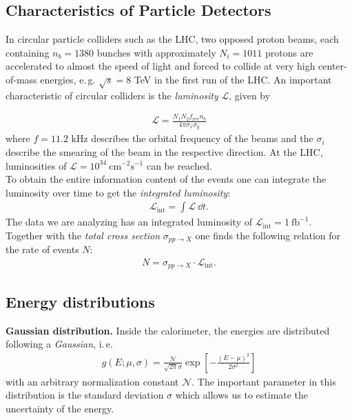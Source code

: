 \documentclass[twocolumn,
			   showpacs,%
               nofootinbib,
               aps,%
               prd,
               notitlepage,
               showkeys,
               10pt]{revtex4-1}
\begin{document}
\subsection{Characteristics of Particle Detectors}
In circular particle colliders such as the LHC, two opposed proton beams, each containing $n_b = 1380$ bunches with approximately $N_i = 1011$ protons are accelerated to almost the speed of light and forced to collide at very high center-of-mass energies, e.\,g. $\sqrt{s} = 8$ TeV in the first run of the LHC. An important characteristic of circular colliders is the \textit{luminosity} $\mathcal{L}$, given by

\begin{align}
\mathcal{L} = \frac{N_1N_2f_{\text{rev}}n_b}{4\pi\sigma_x\sigma_y}
\end{align}
where $f = 11.2$ kHz describes the orbital frequency of the beams and the $\sigma_i$ describe the smearing of the beam in the respective direction. At the LHC, luminosities of $\mathcal{L}=10^{34} \ \mathrm{cm}^{-2} \mathrm{s}^{-1}$ can be reached.\\
To obtain the entire information content of the events one can integrate the luminosity over time to get the \textit{integrated luminosity}:
\begin{align}
\mathcal{L}_{\text{int}} = \int \mathcal{L} \ \dd t.
\end{align}
The data we are analyzing has an integrated luminosity of $\mathcal{L}_{\mathrm{int}}=1 \ \mathrm{fb}^{-1}$.\\
Together with the \textit{total cross section} $\sigma_{pp\rightarrow X}$ one finds the following relation for the rate of events $N$: 
\begin{align}
N = \sigma_{pp\rightarrow X} \cdot \mathcal{L}_{\text{int}}.
\end{align}

\subsection{Energy distributions}
\textbf{Gaussian distribution.} Inside the calorimeter, the energies are distributed following a \textit{Gaussian}, i.\,e. 
\begin{align}
g(E ; \mu, \sigma)=\frac{\mathcal{N}}{\sqrt{2 \pi} \sigma} \exp \left[-\frac{(E-\mu)^{2}}{2 \sigma^{2}}\right]
\label{eqn:Gaussian}
\end{align}
with an arbitrary normalization constant $\mathcal{N}$. The important parameter in this distribution is the standard deviation $\sigma$ which allows us to estimate the uncertainty of the energy.\\
\end{document}
